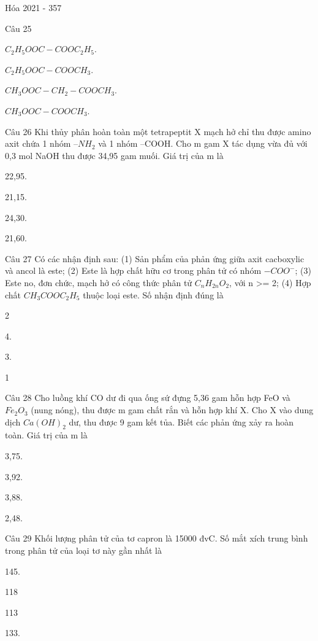 \documentclass{book}
\begin{document}
\begin{quiz}{Hóa 2021 - 357}
\begin{multi}[points=1]{Câu 25}
\item  $C_2H_5OOC-COOC_2H_5$.	
\item  $C_2H_5OOC-COOCH_3$.	
\item  $CH_3OOC-CH_2-COOCH_3$.	
\item*  $CH_3OOC-COOCH_3$.
\end{multi}

\begin{multi}[points=1]{Câu 26}
 Khi thủy phân hoàn toàn một tetrapeptit X mạch hở chỉ thu được amino axit chứa 1 nhóm $–NH_2$ và 1 nhóm –COOH. Cho m gam X tác dụng vừa đủ với 0,3 mol NaOH thu được 34,95 gam muối. Giá trị của m là

\item  22,95.	
\item  21,15.	
\item*  24,30.	
\item  21,60.
\end{multi}

\begin{multi}[points=1]{Câu 27}
 Có các nhận định sau: (1) Sản phẩm của phản ứng giữa axit cacboxylic và ancol là este; (2) Este là hợp chất hữu cơ trong phân tử có nhóm $-COO^-$; (3) Este no, đơn chức, mạch hở có công thức phân tử $C_nH_{2n}O_2$, với n >= 2; (4) Hợp chất $CH_3COOC_2H_5$ thuộc loại este. Số nhận định đúng là

\item  2	
\item  4.	
\item*  3.	
\item  1
\end{multi}

\begin{multi}[points=1]{Câu 28}
 Cho luồng khí CO dư đi qua ống sứ đựng 5,36 gam hỗn hợp FeO và $Fe_2O_3$ (nung nóng), thu được m gam chất rắn và hỗn hợp khí X. Cho X vào dung dịch $Ca(OH)_2$ dư, thu được 9 gam kết tủa. Biết các phản ứng xảy ra hoàn toàn. Giá trị của m là

\item  3,75.	
\item*  3,92.	
\item  3,88.	
\item  2,48.
\end{multi}

\begin{multi}[points=1]{Câu 29}
 Khối lượng phân tử của tơ capron là 15000 đvC. Số mắt xích trung bình trong phân tử của loại tơ này gần nhất là

\item  145.	
\item 118
\item  113
\item*  133.
\end{multi}


\end{quiz}
\end{document}
